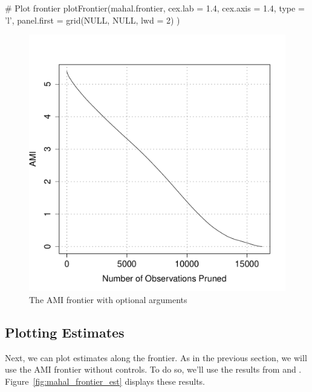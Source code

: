 \documentclass[nojss]{jss}
\begin{document}
\begin{minipage}{0.45\textwidth}
\begin{CodeChunk}
\begin{CodeInput}
# Plot frontier
plotFrontier(mahal.frontier,
             cex.lab = 1.4,
             cex.axis = 1.4,
             type = 'l',
             panel.first = 
                grid(NULL, 
                     NULL, 
                     lwd = 2)
             )
\end{CodeInput}
\end{CodeChunk}
\end{minipage}
\begin{minipage}{0.5\textwidth}
\begin{figure}[H]
\includegraphics{mahal_frontier_pretty.pdf}
\caption{\label{fig:mahal_frontier_pretty} The AMI frontier with optional arguments}
\end{figure}
\end{minipage} \hfill
\newline
\newline

\subsection{Plotting Estimates}

Next, we can plot estimates along the frontier. As in the previous
section, we will use the AMI frontier without controls. To do so,
we'll use the results from  and
. Figure~\ref{fig:mahal_frontier_est} displays these
results.
\end{document}
